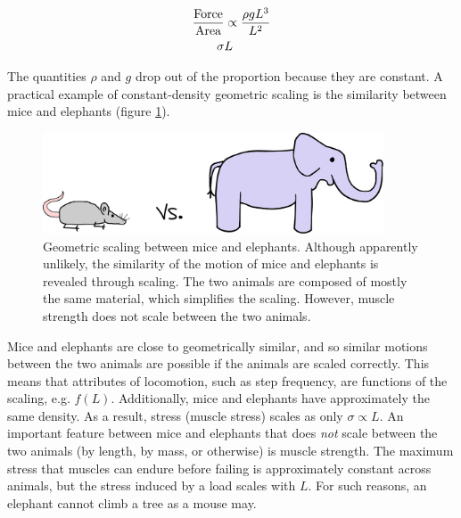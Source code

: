 \begin{align}
\frac{\mbox{Force}}{\mbox{Area}} &\propto \frac{\rho g L^3}{L^2} \notag \\
\sigma & L
\end{align}

The quantities $\rho$ and $g$ drop out of the proportion because they are constant. A practical example of constant-density geometric scaling is the similarity between mice and elephants (figure \ref{fig:ElephantMouse}). 

\begin{figure}[h]		%
\begin{centering}
\includegraphics[width=0.9\textwidth]{Figures/ElephantMouse}\par
\end{centering}
\caption[Diagram: Geometric Scaling between Mice and Elephants]{Geometric scaling between mice and elephants. Although apparently unlikely, the similarity of the motion of mice and elephants is revealed through scaling. The two animals are composed of mostly the same material, which simplifies the scaling. However, muscle strength does not scale between the two animals.}
\label{fig:ElephantMouse}
\end{figure}
%
Mice and elephants are close to geometrically similar, and so similar motions between the two animals are possible if the animals are scaled correctly. This means that attributes of locomotion, such as step frequency, are functions of the scaling, e.g. $f(L)$. Additionally, mice and elephants have approximately the same density. As a result, stress (muscle stress) scales as only $\sigma \propto L$. An important feature between mice and elephants that does \textit{not} scale between the two animals (by length, by mass, or otherwise) is muscle strength. The maximum stress that muscles can endure before failing is approximately constant across animals, but the stress induced by a load scales with $L$. For such reasons, an elephant cannot climb a tree as a mouse may.

